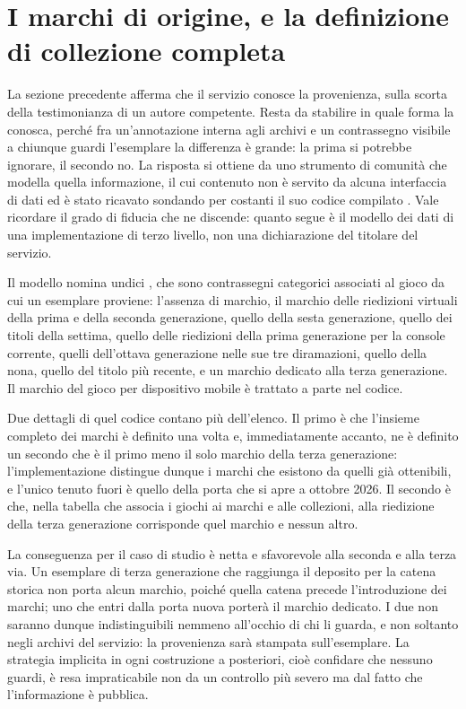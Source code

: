 \section{I marchi di origine, e la definizione di collezione completa}

La sezione precedente afferma che il servizio conosce la provenienza, sulla scorta della testimonianza di un autore competente. Resta da stabilire in quale forma la conosca, perché fra un'annotazione interna agli archivi e un contrassegno visibile a chiunque guardi l'esemplare la differenza è grande: la prima si potrebbe ignorare, il secondo no. La risposta si ottiene da uno strumento di comunità che modella quella informazione, il cui contenuto non è servito da alcuna interfaccia di dati ed è stato ricavato sondando per costanti il suo codice compilato \cite{home-checklist}. Vale ricordare il grado di fiducia che ne discende: quanto segue è il modello dei dati di una implementazione di terzo livello, non una dichiarazione del titolare del servizio.

Il modello nomina undici , che sono contrassegni categorici associati al gioco da cui un esemplare proviene: l'assenza di marchio, il marchio delle riedizioni virtuali della prima e della seconda generazione, quello della sesta generazione, quello dei titoli della settima, quello delle riedizioni della prima generazione per la console corrente, quelli dell'ottava generazione nelle sue tre diramazioni, quello della nona, quello del titolo più recente, e un marchio dedicato alla terza generazione. Il marchio del gioco per dispositivo mobile è trattato a parte nel codice.

Due dettagli di quel codice contano più dell'elenco. Il primo è che l'insieme completo dei marchi è definito una volta e, immediatamente accanto, ne è definito un secondo che è il primo meno il solo marchio della terza generazione: l'implementazione distingue dunque i marchi che esistono da quelli già ottenibili, e l'unico tenuto fuori è quello della porta che si apre a ottobre 2026. Il secondo è che, nella tabella che associa i giochi ai marchi e alle collezioni, alla riedizione della terza generazione corrisponde quel marchio e nessun altro.

La conseguenza per il caso di studio è netta e sfavorevole alla seconda e alla terza via. Un esemplare di terza generazione che raggiunga il deposito per la catena storica non porta alcun marchio, poiché quella catena precede l'introduzione dei marchi; uno che entri dalla porta nuova porterà il marchio dedicato. I due non saranno dunque indistinguibili nemmeno all'occhio di chi li guarda, e non soltanto negli archivi del servizio: la provenienza sarà stampata sull'esemplare. La strategia implicita in ogni costruzione a posteriori, cioè confidare che nessuno guardi, è resa impraticabile non da un controllo più severo ma dal fatto che l'informazione è pubblica.

